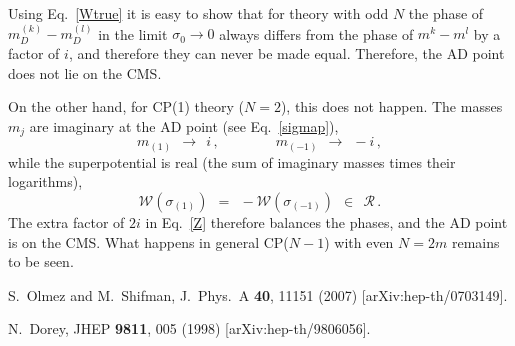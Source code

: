 \documentclass[12pt]{article}
\newcommand{\mc}[1]{\mathcal{#1}}
\begin{document}
Using Eq.~\eqref{Wtrue} it is easy to show that for theory with odd $N$ the phase of 
$ m_D^{(k)} - m_D^{(l)} $ in the limit $ \sigma_0 \to 0 $ always differs from the 
phase of $ m^k - m^l $ by a factor of $ i $, and therefore they can never be made equal. 
Therefore, the AD point does not lie on the CMS.

On the other hand, for CP(1) theory ($N = 2$), this does not happen. 
The masses $m_j$ are imaginary at the AD point (see Eq.~\eqref{sigmap}), 
\[
	m_{(1)}  ~~\to~~ i\,, \qquad\qquad  m_{(-1)}  ~~\to~~  -i\,,
\]
while the superpotential is real (the sum of imaginary masses times their logarithms),
\[
	\mc{W}(\sigma_{(1)})  ~~=~~ - \mc{W}(\sigma_{(-1)}) ~~\in~~ \mc{R}\,.
\]
The extra factor of $ 2i $ in Eq.~\eqref{Z} therefore balances the phases, and the AD point
is on the CMS. 
What happens in general CP($N-1$) with even $N = 2 m$ remains to be seen.


\begin{thebibliography}{99}
  S.~Olmez and M.~Shifman,
  J.\ Phys.\ A  {\bf 40}, 11151 (2007)
  [arXiv:hep-th/0703149].

  N.~Dorey,
  JHEP {\bf 9811}, 005 (1998)
  [arXiv:hep-th/9806056].

\end{thebibliography}
\end{document}
